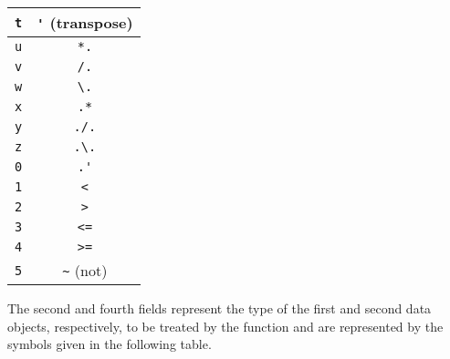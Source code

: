 \begin{center}
\begin{tabular}{|c|c|}
\verb!t! & \verb!'!  (transpose) \\ \hline

\verb!u! & \verb!*.!  \\ \hline

\verb!v! & \verb!/.!  \\ \hline

\verb!w! & \verb!\.!  \\ \hline

\verb!x! & \verb!.*!  \\ \hline

\verb!y! & \verb!./.!  \\ \hline

\verb!z! & \verb!.\.!  \\ \hline

\verb!0! & \verb!.'!  \\ \hline

\verb!1! & \verb!<!  \\ \hline

\verb!2! & \verb!>!  \\ \hline

\verb!3! & \verb!<=!  \\ \hline

\verb!4! & \verb!>=!  \\ \hline

\verb!5! & \verb!~!  (not)\\ \hline

\end{tabular}
\end{center}

The second
and fourth fields represent the type of the first and second data objects,
respectively, 
to be treated by the function and are represented by the symbols given
in the following table.

